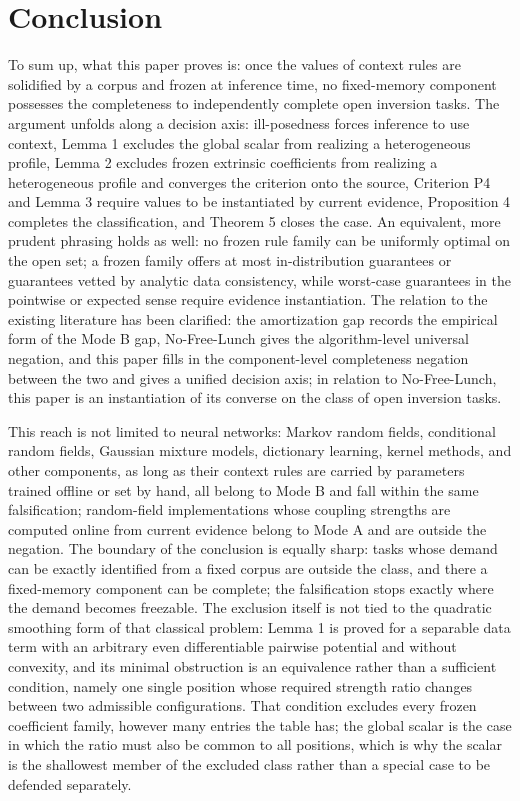 \section{Conclusion}
\label{ch:conclusion}

To sum up, what this paper proves is: once the values of context rules are solidified by a corpus and frozen at inference time, no fixed-memory component possesses the completeness to independently complete open inversion tasks. The argument unfolds along a decision axis: ill-posedness forces inference to use context, Lemma 1 excludes the global scalar from realizing a heterogeneous profile, Lemma 2 excludes frozen extrinsic coefficients from realizing a heterogeneous profile and converges the criterion onto the source, Criterion P4 and Lemma 3 require values to be instantiated by current evidence, Proposition 4 completes the classification, and Theorem 5 closes the case. An equivalent, more prudent phrasing holds as well: no frozen rule family can be uniformly optimal on the open set; a frozen family offers at most in-distribution guarantees or guarantees vetted by analytic data consistency, while worst-case guarantees in the pointwise or expected sense require evidence instantiation. The relation to the existing literature has been clarified: the amortization gap records the empirical form of the Mode B gap, No-Free-Lunch gives the algorithm-level universal negation, and this paper fills in the component-level completeness negation between the two and gives a unified decision axis; in relation to No-Free-Lunch, this paper is an instantiation of its converse on the class of open inversion tasks.

This reach is not limited to neural networks: Markov random fields, conditional random fields, Gaussian mixture models, dictionary learning, kernel methods, and other components, as long as their context rules are carried by parameters trained offline or set by hand, all belong to Mode B and fall within the same falsification; random-field implementations whose coupling strengths are computed online from current evidence belong to Mode A and are outside the negation. The boundary of the conclusion is equally sharp: tasks whose demand can be exactly identified from a fixed corpus are outside the class, and there a fixed-memory component can be complete; the falsification stops exactly where the demand becomes freezable. The exclusion itself is not tied to the quadratic smoothing form of that classical problem: Lemma 1 is proved for a separable data term with an arbitrary even differentiable pairwise potential and without convexity, and its minimal obstruction is an equivalence rather than a sufficient condition, namely one single position whose required strength ratio changes between two admissible configurations. That condition excludes every frozen coefficient family, however many entries the table has; the global scalar is the case in which the ratio must also be common to all positions, which is why the scalar is the shallowest member of the excluded class rather than a special case to be defended separately.

